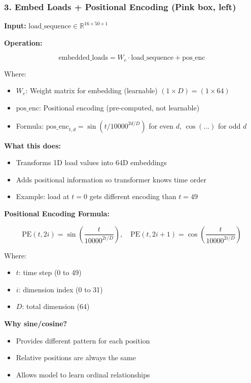 \documentclass[11pt,a4paper]{article}
\begin{document}
\subsubsection{3. Embed Loads + Positional Encoding (Pink box, left)}

\textbf{Input:} $\text{load\_sequence} \in \mathbb{R}^{16 \times 50 \times 1}$

\textbf{Operation:}

\begin{equation}
\text{embedded\_loads} = W_e \cdot \text{load\_sequence} + \text{pos\_enc}
\end{equation}

Where:
\begin{itemize}
  \item $W_e$: Weight matrix for embedding (learnable) $(1 \times D) = (1 \times 64)$
  \item $\text{pos\_enc}$: Positional encoding (pre-computed, not learnable)
  \item Formula: $\text{pos\_enc}_{t,d} = \sin(t/10000^{2d/D})$ for even $d$, $\cos(...)$ for odd $d$
\end{itemize}

\textbf{What this does:}
\begin{itemize}
  \item Transforms 1D load values into 64D embeddings
  \item Adds positional information so transformer knows time order
  \item Example: load at $t=0$ gets different encoding than $t=49$
\end{itemize}

\textbf{Positional Encoding Formula:}

\begin{equation}
\text{PE}(t, 2i) = \sin\left(\frac{t}{10000^{2i/D}}\right), \quad \text{PE}(t, 2i+1) = \cos\left(\frac{t}{10000^{2i/D}}\right)
\end{equation}

Where:
\begin{itemize}
  \item $t$: time step (0 to 49)
  \item $i$: dimension index (0 to 31)
  \item $D$: total dimension (64)
\end{itemize}

\textbf{Why sine/cosine?}
\begin{itemize}
  \item Provides different pattern for each position
  \item Relative positions are always the same
  \item Allows model to learn ordinal relationships
\end{itemize}
\end{document}

